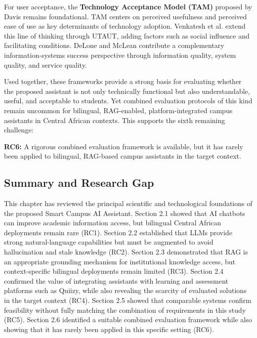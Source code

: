 \documentclass[a4paper,9pt,twocolumn]{extarticle}
\begin{document}
For user acceptance, the \textbf{Technology Acceptance Model (TAM)}
proposed by Davis \cite{davis1989} remains foundational. TAM centers on
perceived usefulness and perceived ease of use as key determinants of
technology adoption. Venkatesh et al. \cite{venkatesh2003} extend this
line of thinking through UTAUT, adding factors such as social influence
and facilitating conditions. DeLone and McLean
\cite{delone2003} contribute a complementary information-systems success
perspective through information quality, system quality, and service
quality.

Used together, these frameworks provide a strong basis for evaluating
whether the proposed assistant is not only technically functional but
also understandable, useful, and acceptable to students. Yet combined
evaluation protocols of this kind remain uncommon for bilingual,
RAG-enabled, platform-integrated campus assistants in Central African
contexts. This supports the sixth remaining challenge:

\textbf{RC6:} A rigorous combined evaluation framework is available, but
it has rarely been applied to bilingual, RAG-based campus assistants in
the target context.

\subsection{Summary and Research Gap}
\label{sec:soa:gap}

This chapter has reviewed the principal scientific and technological
foundations of the proposed Smart Campus AI Assistant. Section 2.1
showed that AI chatbots can improve academic information access, but
bilingual Central African deployments remain rare (RC1). Section 2.2
established that LLMs provide strong natural-language capabilities but
must be augmented to avoid hallucination and stale knowledge (RC2).
Section 2.3 demonstrated that RAG is an appropriate grounding mechanism
for institutional knowledge access, but context-specific bilingual
deployments remain limited (RC3). Section 2.4 confirmed the value of
integrating assistants with learning and assessment platforms such as
Quiizy, while also revealing the scarcity of evaluated solutions in the
target context (RC4). Section 2.5 showed that comparable systems confirm
feasibility without fully matching the combination of requirements in
this study (RC5). Section 2.6 identified a suitable combined evaluation
framework while also showing that it has rarely been applied in this
specific setting (RC6).
\end{document}
